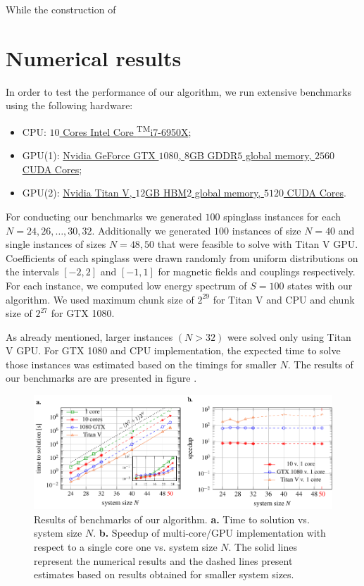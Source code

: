 While the construction of

\section{Numerical results}
In order to test the performance of our algorithm, we run extensive benchmarks using the following hardware:
%
\begin{itemize}
\item CPU:
\href{https://ark.intel.com/products/94456/Intel-Core-i7-6950X-Processor-Extreme-Edition-25M-Cache-up-to-3-50-GHz-}{$10$
Cores {\rmfamily Intel\textregistered} Core \textsuperscript{TM}i7-6950X};
%
\item GPU(1): \href{https://www.nvidia.com/en-us/geforce/products/10series/geforce-gtx-1080}{Nvidia GeForce GTX $1080$, $8$GB GDDR$5$ global memory, $2560$ CUDA Cores};
%
\item  GPU(2): \href{https://www.nvidia.com/en-us/titan/titan-v/}{Nvidia Titan V, $12$GB HBM$2$ global memory, $5120$ CUDA Cores}.
\end{itemize}

For conducting our benchmarks we generated $100$ spinglass instances for each $N=24, 26, \ldots, 30, 32$. Additionally we generated $100$ instances of size $N=40$ and single instances of sizes $N=48, 50$ that were feasible to solve with Titan V GPU. Coefficients of each spinglass were drawn randomly from uniform distributions on the intervals $[-2, 2]$ and $[-1, 1]$ for magnetic fields and couplings respectively. For each instance, we computed low energy spectrum of $S=100$ states with our algorithm. We used maximum chunk size of $2^{29}$ for Titan V and CPU and chunk size of $2^{27}$ for GTX 1080.

As already mentioned, larger instances $(N > 32)$ were solved only using Titan V GPU. For GTX 1080 and CPU implementation, the expected time to solve those instances was estimated based on the timings for smaller $N$. The results of our benchmarks are are presented in figure .

\begin{figure}
    \centering
    \includegraphics[width=\textwidth]{figures/resultsplot_reduced.pdf}
    \caption{Results of benchmarks of our algorithm. {\textbf{a.}} Time to solution vs. system size $N$. {\textbf{b.}} Speedup of multi-core/GPU implementation with respect to a single core one vs. system size $N$. The solid lines represent the numerical results and the dashed lines present estimates based on results obtained for smaller system sizes.}
    \label{fig:benchmark_results}
\end{figure}
